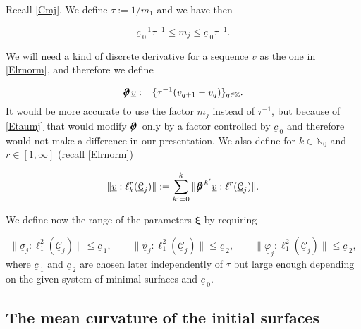 \documentclass[12pt,namelimits,sumlimits]{amsart}
\theoremstyle{remark}
\numberwithin{equation}{section}
\begin{document}
Recall \ref{Cmj}.
We define
$\tau:=1/m_1$ and we have then
\addtocounter{theorem}{1}
\begin{equation}
\label{Etaumj}
{\underline{c}\,}^{-1}_0\tau^{-1}\le m_j \le {\underline{c}\,}_0\tau^{-1}.
\end{equation}

We will need a kind of discrete derivative for a sequence $\underline{v}$ as the one in \ref{Elrnorm},
and therefore we define 
\addtocounter{theorem}{1}
\begin{equation}
\label{Edd}
{{\boldsymbol{\partial}\mspace{.8mu}\!\!\!\!\boldsymbol{/}\,}}\underline{v}:=\{\tau^{-1}(v_{q+1}-v_q)\}_{q\in{\mathbb{Z}}}.
\end{equation}
It would be more accurate to use the factor $m_j$ instead of $\tau^{-1}$,
but because of \ref{Etaumj} that would modify ${{\boldsymbol{\partial}\mspace{.8mu}\!\!\!\!\boldsymbol{/}\,}}$ only by a factor controlled by ${\underline{c}\,}_0$
and therefore would not make a difference in our presentation.
We also define for $k\in{\mathbb{N}}_0$ and $r\in[1,\infty]$ (recall \ref{Elrnorm})
\addtocounter{theorem}{1}
\begin{equation}
\label{Elkrnorm}
\|\underline{v}:\ell_k^r({\underline{{\mathcal{C}}}}_j)\|:=
\sum_{k'=0}^k
\|{{\boldsymbol{\partial}\mspace{.8mu}\!\!\!\!\boldsymbol{/}\,}}^{k'}\underline{v}:\ell^r({\underline{{\mathcal{C}}}}_j)\|.
\end{equation}

We define now the range of the parameters ${{\boldsymbol{\xi}}}$ by requiring 
\addtocounter{theorem}{1}
\begin{equation}
\label{Erange}
\|\underline{\sigma}_j:\ell_1^2({\underline{{\mathcal{C}}}}_j)\|\le {\underline{c}\,}_1,
\qquad
\|\underline{\vartheta}_j:\ell_1^2({\underline{{\mathcal{C}}}}_j)\|\le {\underline{c}\,}_2,
\qquad
\|\underline{\varphi}_j:\ell_1^2({\underline{{\mathcal{C}}}}_j)\|\le {\underline{c}\,}_2,
\end{equation}
where ${\underline{c}\,}_1$ and ${\underline{c}\,}_2$ are chosen later independently of $\tau$
but large enough depending on the given system of minimal surfaces and ${\underline{c}\,}_0$.

\subsection*{The mean curvature of the initial surfaces}
$\phantom{ab}$
\nopagebreak
\end{document}
